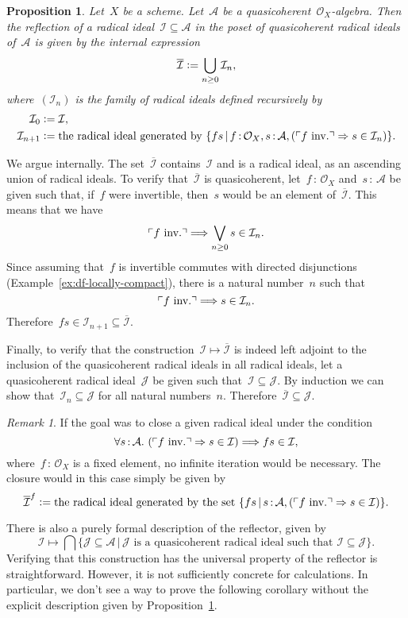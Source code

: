 \documentclass[10pt,reqno,a4paper]{amsbook}
\makeatletter
\theoremstyle{definition}
\theoremstyle{plain}
\newtheorem{prop}[defn]{Proposition}
\theoremstyle{remark}
\newtheorem{rem}[defn]{Remark}
\newcommand{\A}{\mathcal{A}}
\renewcommand{\O}{\mathcal{O}}
\newcommand{\I}{\mathcal{I}}
\newcommand{\J}{\mathcal{J}}
\newcommand{\?}{\,{:}\,}
\renewcommand{\_}{\mathpunct{.}\,}
\newcommand{\speak}[1]{\ulcorner\text{\textnormal{#1}}\urcorner}
\newcommand{\inv}{inv.\@}
\newcommand{\defeq}{\vcentcolon=}
\renewenvironment{proof}[1][\proofname]{\par
  \pushQED{\qed}%
  \normalfont \topsep6\p@\@plus6\p@\relax
  \trivlist
  \item[\hskip\labelsep
        \itshape
    #1\@addpunct{.}]\ignorespaces
}{%
  \popQED\endtrivlist\@endpefalse
}
\makeatother
\begin{document}
\begin{prop}\label{prop:quasicoherator-arbitrary-algebra}
Let~$X$ be a scheme. Let~$\A$ be a quasicoherent~$\O_X$-algebra.
Then the reflection of a radical ideal~$\I \subseteq \A$ in the poset of
quasicoherent radical ideals of~$\A$ is given by the internal expression
\[ \overline{\I} \defeq \bigcup_{n \geq 0} \I_n, \]
where~$(\I_n)$ is the family of radical ideals defined recursively by
\begin{align*}
  \I_0 &\defeq \I, \\
  \I_{n+1} &\defeq \textnormal{the radical ideal generated by
  $\{ fs \,|\, f\?\O_X, s\?\A, (\speak{$f$ \inv} \Rightarrow s \in \I_n) \}$}.
\end{align*}
\end{prop}
\begin{proof}We argue internally. The set~$\overline{\I}$ contains~$\I$ and is
a radical ideal, as an ascending union of radical ideals. To verify
that~$\overline{\I}$ is quasicoherent, let~$f\?\O_X$ and~$s\?\A$ be given such
that, if~$f$ were invertible, then~$s$ would be an element of~$\overline{\I}$.
This means that we have
\[ \speak{$f$ \inv} \Longrightarrow \bigvee_{n \geq 0} s \in \I_n. \]
Since assuming that~$f$ is invertible commutes with directed disjunctions
(Example~\ref{ex:df-locally-compact}), there is a natural number~$n$ such that
\[ \speak{$f$ \inv} \Longrightarrow s \in \I_n. \]
Therefore~$fs \in \I_{n+1} \subseteq \overline{\I}$.

Finally, to verify that the construction~$\I \mapsto \overline{\I}$ is indeed
left adjoint to the inclusion of the quasicoherent radical ideals in all
radical ideals, let a quasicoherent radical ideal~$\J$ be given such that~$\I
\subseteq \J$. By induction we can show that~$\I_n \subseteq \J$ for all
natural numbers~$n$. Therefore~$\overline{\I} \subseteq \J$.
\end{proof}

\begin{rem}\label{rem:reflector-single-element}
If the goal was to close a given radical ideal under the condition
\[ \forall s\?\A\_ (\speak{$f$ \inv} \Rightarrow s \in \I) \Longrightarrow fs \in \I, \]
where~$f \? \O_X$ is a fixed element, no infinite iteration would be necessary.
The closure would in this case simply be given by
\[ \overline{\I}^f \defeq \text{the radical ideal generated by the set~$\{ fs
\,|\, s \? \A, (\speak{$f$ \inv} \Rightarrow s \in \I) \}$}. \]\end{rem}

There is also a purely formal description of the reflector, given by
\[ \I \longmapsto \bigcap \{ \J \subseteq \A \,|\,
  \text{$\J$ is a quasicoherent radical ideal such that~$\I \subseteq \J$} \}. \]
Verifying that this construction has the universal property of
the reflector is straightforward. However, it is not sufficiently concrete for
calculations. In particular, we don't see a way to prove the following
corollary without the explicit description given by
Proposition~\ref{prop:quasicoherator-arbitrary-algebra}.
\end{document}
